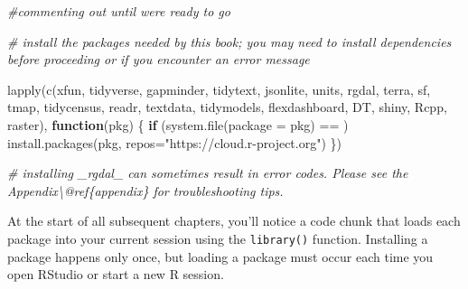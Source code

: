 \documentclass[
  krantz2]{krantz}
\makeatletter
\newenvironment{Shaded}{\begin{snugshade}}{\end{snugshade}}
\newcommand{\AttributeTok}[1]{\textcolor[rgb]{0.61,0.61,0.61}{#1}}
\newcommand{\CommentTok}[1]{\textcolor[rgb]{0.37,0.37,0.37}{\textit{#1}}}
\newcommand{\ControlFlowTok}[1]{\textcolor[rgb]{0.27,0.27,0.27}{\textbf{#1}}}
\newcommand{\FunctionTok}[1]{\textcolor[rgb]{0,0,0}{#1}}
\newcommand{\NormalTok}[1]{#1}
\newcommand{\SpecialCharTok}[1]{\textcolor[rgb]{0,0,0}{#1}}
\newcommand{\StringTok}[1]{\textcolor[rgb]{0.5,0.5,0.5}{#1}}
\newenvironment{kframe}{%
\medskip{}
\setlength{\fboxsep}{.8em}
 \def\at@end@of@kframe{}%
 \ifinner\ifhmode%
  \def\at@end@of@kframe{\end{minipage}}%
  \begin{minipage}{\columnwidth}%
 \fi\fi%
 \def\FrameCommand##1{\hskip\@totalleftmargin \hskip-\fboxsep
 \colorbox{shadecolor}{##1}\hskip-\fboxsep
     \hskip-\linewidth \hskip-\@totalleftmargin \hskip\columnwidth}%
 \MakeFramed {\advance\hsize-\width
   \@totalleftmargin\z@ \linewidth\hsize
   \@setminipage}}%
 {\par\unskip\endMakeFramed%
 \at@end@of@kframe}
\renewenvironment{Shaded}{\begin{kframe}}{\end{kframe}}
\makeatother
\begin{document}
\begin{Shaded}
\begin{Highlighting}[]
\CommentTok{\#commenting out until we\textquotesingle{}re ready to go}

\CommentTok{\# install the packages needed by this book; you may need to install dependencies before proceeding or if you encounter an error message}

\FunctionTok{lapply}\NormalTok{(}\FunctionTok{c}\NormalTok{(}\StringTok{\textquotesingle{}xfun\textquotesingle{}}\NormalTok{, }\StringTok{\textquotesingle{}tidyverse\textquotesingle{}}\NormalTok{, }\StringTok{\textquotesingle{}gapminder\textquotesingle{}}\NormalTok{, }\StringTok{\textquotesingle{}tidytext\textquotesingle{}}\NormalTok{, }\StringTok{\textquotesingle{}jsonlite\textquotesingle{}}\NormalTok{, }\StringTok{\textquotesingle{}units\textquotesingle{}}\NormalTok{, }\StringTok{\textquotesingle{}rgdal\textquotesingle{}}\NormalTok{, }\StringTok{\textquotesingle{}terra\textquotesingle{}}\NormalTok{, }\StringTok{\textquotesingle{}sf\textquotesingle{}}\NormalTok{, }\StringTok{\textquotesingle{}tmap\textquotesingle{}}\NormalTok{, }\StringTok{\textquotesingle{}tidycensus\textquotesingle{}}\NormalTok{, }\StringTok{\textquotesingle{}readr\textquotesingle{}}\NormalTok{, }\StringTok{\textquotesingle{}textdata\textquotesingle{}}\NormalTok{, }\StringTok{\textquotesingle{}tidymodels\textquotesingle{}}\NormalTok{, }\StringTok{\textquotesingle{}flexdashboard\textquotesingle{}}\NormalTok{, }\StringTok{\textquotesingle{}DT\textquotesingle{}}\NormalTok{, }\StringTok{\textquotesingle{}shiny\textquotesingle{}}\NormalTok{, }\StringTok{\textquotesingle{}Rcpp\textquotesingle{}}\NormalTok{, }\StringTok{\textquotesingle{}raster\textquotesingle{}}\NormalTok{), }\ControlFlowTok{function}\NormalTok{(pkg) \{}
\ControlFlowTok{if}\NormalTok{ (}\FunctionTok{system.file}\NormalTok{(}\AttributeTok{package =}\NormalTok{ pkg) }\SpecialCharTok{==} \StringTok{\textquotesingle{}\textquotesingle{}}\NormalTok{) }\FunctionTok{install.packages}\NormalTok{(pkg, }\AttributeTok{repos=}\StringTok{"https://cloud.r{-}project.org"}\NormalTok{)}
\NormalTok{\})}

\CommentTok{\# installing \_rgdal\_ can sometimes result in error codes. Please see the Appendix\textbackslash{}@ref\{appendix\} for troubleshooting tips.}
\end{Highlighting}
\end{Shaded}

At the start of all subsequent chapters, you'll notice a code chunk that loads each package into your current session using the \texttt{library()} function. Installing a package happens only once, but loading a package must occur each time you open RStudio or start a new R session.
\end{document}
